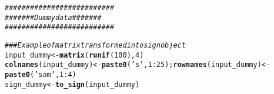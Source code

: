 \documentclass{article}\usepackage[]{graphicx}\usepackage[]{color}
\makeatletter
\newcommand{\hlnum}[1]{\textcolor[rgb]{0.686,0.059,0.569}{#1}}%
\newcommand{\hlstr}[1]{\textcolor[rgb]{0.192,0.494,0.8}{#1}}%
\newcommand{\hlcom}[1]{\textcolor[rgb]{0.678,0.584,0.686}{\textit{#1}}}%
\newcommand{\hlopt}[1]{\textcolor[rgb]{0,0,0}{#1}}%
\newcommand{\hlstd}[1]{\textcolor[rgb]{0.345,0.345,0.345}{#1}}%
\newcommand{\hlkwb}[1]{\textcolor[rgb]{0.69,0.353,0.396}{#1}}%
\newcommand{\hlkwd}[1]{\textcolor[rgb]{0.737,0.353,0.396}{\textbf{#1}}}%
\newenvironment{kframe}{%
 \def\at@end@of@kframe{}%
 \ifinner\ifhmode%
  \def\at@end@of@kframe{\end{minipage}}%
  \begin{minipage}{\columnwidth}%
 \fi\fi%
 \def\FrameCommand##1{\hskip\@totalleftmargin \hskip-\fboxsep
 \colorbox{shadecolor}{##1}\hskip-\fboxsep
     \hskip-\linewidth \hskip-\@totalleftmargin \hskip\columnwidth}%
 \MakeFramed {\advance\hsize-\width
   \@totalleftmargin\z@ \linewidth\hsize
   \@setminipage}}%
 {\par\unskip\endMakeFramed%
 \at@end@of@kframe}
\newenvironment{knitrout}{}{} %
\makeatother
\begin{document}
\begin{knitrout}
\color{fgcolor}\begin{kframe}
\begin{alltt}
\hlcom{##########################}
\hlcom{####### Dummy data #######}
\hlcom{##########################}

\hlcom{### Example of matrix transformed into sign object}
\hlstd{input_dummy} \hlkwb{<-} \hlkwd{matrix}\hlstd{(}\hlkwd{runif}\hlstd{(}\hlnum{100}\hlstd{),} \hlnum{4}\hlstd{)}
\hlkwd{colnames}\hlstd{(input_dummy)} \hlkwb{<-} \hlkwd{paste0}\hlstd{(}\hlstr{'s'}\hlstd{,} \hlnum{1}\hlopt{:}\hlnum{25}\hlstd{);} \hlkwd{rownames}\hlstd{(input_dummy)} \hlkwb{<-} \hlkwd{paste0}\hlstd{(}\hlstr{'sam'}\hlstd{,} \hlnum{1}\hlopt{:}\hlnum{4}\hlstd{)}
\hlstd{sign_dummy} \hlkwb{<-} \hlkwd{to_sign}\hlstd{(input_dummy)}
\end{alltt}
\end{kframe}
\end{knitrout}
\end{document}
